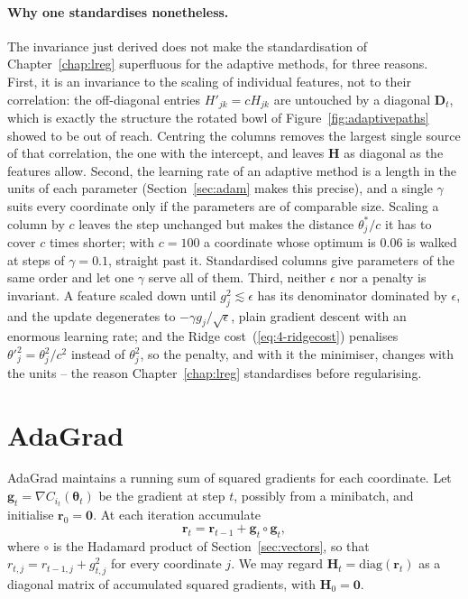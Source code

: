 \paragraph{Why one standardises nonetheless.}
The invariance just derived does not make the standardisation of
Chapter~\ref{chap:lreg} superfluous for the adaptive methods, for three
reasons.  First, it is an invariance to the scaling of individual features,
not to their correlation: the off-diagonal entries $H'_{jk}=cH_{jk}$ are
untouched by a diagonal $\bm{D}_t$, which is exactly the structure the
rotated bowl of Figure~\ref{fig:adaptivepaths} showed to be out of reach.
Centring the columns removes the largest single source of that correlation,
the one with the intercept, and leaves $\bm{H}$ as diagonal as the features
allow.  Second, the learning rate of an adaptive method is a length in the
units of each parameter (Section~\ref{sec:adam} makes this precise), and a
single $\gamma$ suits every coordinate only if the parameters are of
comparable size.  Scaling a column by $c$ leaves the step unchanged but
makes the distance $\theta^{*}_j/c$ it has to cover $c$ times shorter; with
$c=100$ a coordinate whose optimum is $0.06$ is walked at steps of
$\gamma=0.1$, straight past it.  Standardised columns give parameters of the
same order and let one $\gamma$ serve all of them.  Third, neither $\epsilon$
nor a penalty is invariant.  A feature scaled down until $g_j^{2}\lesssim\epsilon$
has its denominator dominated by $\epsilon$, and the update degenerates to
$-\gamma g_j/\sqrt{\epsilon}$, plain gradient descent with an enormous
learning rate; and the Ridge cost~(\ref{eq:4-ridgecost}) penalises
$\theta'^{2}_j=\theta_j^{2}/c^{2}$ instead of $\theta_j^{2}$, so the penalty,
and with it the minimiser, changes with the units -- the reason
Chapter~\ref{chap:lreg} standardises before regularising.

\section{AdaGrad}
\label{sec:adagrad}

AdaGrad maintains a running sum of squared gradients for each coordinate.  Let
$\bm{g}_t=\nabla C_{i_t}(\bm{\theta}_t)$ be the gradient at step $t$, possibly
from a minibatch, and initialise $\bm{r}_0=\bm{0}$.  At each iteration
accumulate
\begin{equation}
  \bm{r}_t = \bm{r}_{t-1} + \bm{g}_t\circ\bm{g}_t,
  \label{eq:4-adagradaccum}
\end{equation}
where $\circ$ is the Hadamard product of Section~\ref{sec:vectors}, so that
$r_{t,j}=r_{t-1,j}+g_{t,j}^{2}$ for every coordinate $j$.  We may regard
$\bm{H}_t=\mathrm{diag}(\bm{r}_t)$ as a diagonal matrix of accumulated squared
gradients, with $\bm{H}_0=\bm{0}$.

